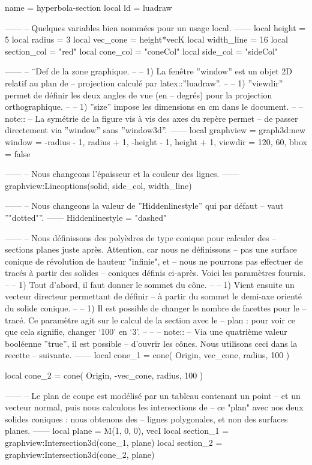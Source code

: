 \documentclass{standalone}
\begin{document}
\begin{luadraw}{name = hyperbola-section}
local ld = luadraw

------
-- Quelques variables bien nommées pour un usage local.
------
local height      =  5
local radius      =  3
local vec_cone    = height*vecK
local width_line  =  16
local section_col = "red"
local cone_col    = "coneCol"
local side_col    = "sideCol"

------
-- ¨Def de la zone graphique.
--
--     1) La fenêtre ''window'' est un objet 2D relatif au plan de
--     projection calculé par latex::''luadraw''.
--
--     1) ''viewdir'' permet de définir les deux angles de vue (en
--     degrés) pour la projection orthographique.
--
--     1) ''size'' impose les dimensions en cm dans le document.
--
-- note::
--     La symétrie de la figure vis à vis des axes du repère permet
--     de passer directement via ''window'' sans ''window3d''.
------
local graphview = graph3d:new{
  window  = {-radius - 1, radius + 1, -height - 1, height + 1},
  viewdir = {120, 60},
  bbox    = false
}

------
-- Nous changeons l'épaisseur et la couleur des lignes.
------
graphview:Lineoptions(solid, side_col, width_line)

------
-- Nous changeons la valeur de ''Hiddenlinestyle'' qui par défaut
-- vaut ''"dotted"''.
------
Hiddenlinestyle = "dashed"

------
-- Nous définissons des polyèdres de type conique pour calculer des
-- sections planes juste après. Attention, car nous ne définissons
-- pas une surface conique de révolution de hauteur "infinie", et
-- nous ne pourrons pas effectuer de tracés à partir des solides
-- coniques définis ci-après. Voici les paramètres fournis.
--
--     1) Tout d'abord, il faut donner le sommet du cône.
--
--     1) Vient ensuite un vecteur directeur permettant de définir
--     à partir du sommet le demi-axe orienté du solide conique.
--
--     1) Il est possible de changer le nombre de facettes pour le
--     tracé. Ce paramètre agit sur le calcul de la section avec le
--     plan : pour voir ce que cela signifie, changer `100' en `3'.
--
--
-- note::
--     Via une quatrième valeur booléenne ''true'', il est possible
--     d'ouvrir les cônes. Nous utilisons ceci dans la recette
--     suivante.
------
local cone_1 = cone(
  Origin, vec_cone, radius,
  100
)

local cone_2 = cone(
  Origin,  -vec_cone, radius,
  100
)

------
-- Le plan de coupe est modélisé par un tableau contenant un point
-- et un vecteur normal, puis nous calculons les intersections de
-- ce "plan" avec nos deux solides coniques : nous obtenons des
-- lignes polygonales, et non des surfaces planes.
------
local plane     = {M(1, 0, 0), vecI}
local section_1 = graphview:Intersection3d(cone_1, plane)
local section_2 = graphview:Intersection3d(cone_2, plane)


\end{luadraw}
\end{document}
